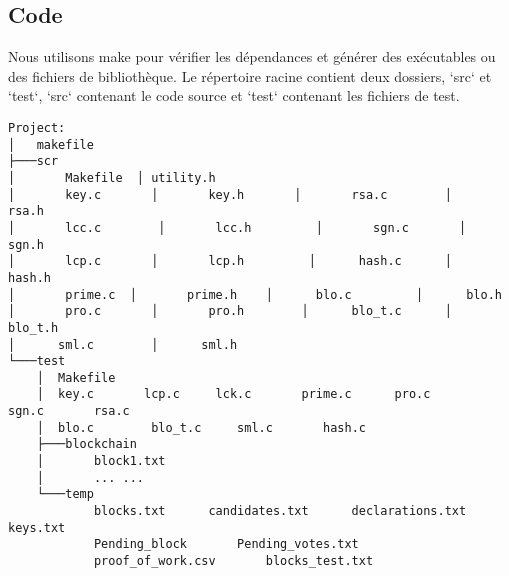 \documentclass{article}
\begin{document}
\subsection{Code}
Nous utilisons make pour vérifier les dépendances et générer des exécutables ou des fichiers de bibliothèque.\newline
Le répertoire racine contient deux dossiers, `src` et `test`, `src` contenant le code source et `test` contenant les fichiers de test.
\begin{lstlisting}
Project:
│   makefile
├───scr
│       Makefile  │ utility.h
│       key.c       │       key.h		│       rsa.c        │       rsa.h
│       lcc.c        │       lcc.h		   │       sgn.c       │       sgn.h
│       lcp.c       │       lcp.h		  │      hash.c      │      hash.h
│       prime.c  │       prime.h	│      blo.c         │      blo.h
│       pro.c       │       pro.h	   	 │      blo_t.c      │      blo_t.h
│      sml.c        │      sml.h
└───test
    │  Makefile 
    │  key.c       lcp.c     lck.c       prime.c      pro.c       sgn.c       rsa.c
    │  blo.c		blo_t.c		sml.c		hash.c
    ├───blockchain
    │       block1.txt
    │		... ...
    └───temp
            blocks.txt		candidates.txt		declarations.txt		keys.txt
            Pending_block		Pending_votes.txt
            proof_of_work.csv		blocks_test.txt
\end{lstlisting}
\end{document}
